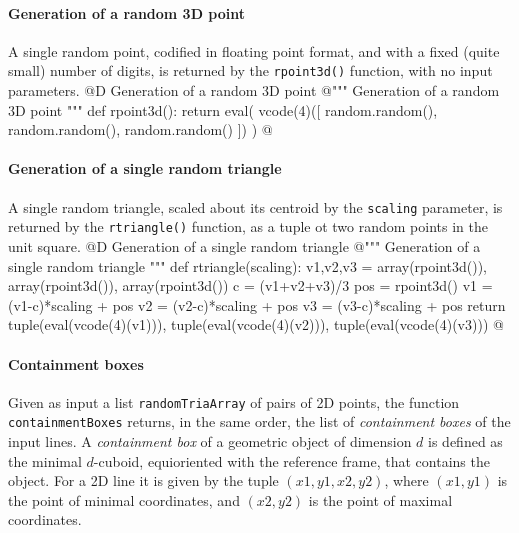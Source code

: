 \documentclass[11pt,oneside]{article}    %
\begin{document}
\paragraph{Generation of a random 3D point}
A single random point, codified in floating point format, and with a fixed (quite small) number of digits, is returned by the \texttt{rpoint3d()} function, with no input parameters.
@D Generation of a random 3D point
@{""" Generation of a random 3D point """
def rpoint3d():
    return eval( vcode(4)([ random.random(), random.random(), random.random() ]) )
@}
    
\paragraph{Generation of a single random triangle}
A single random triangle, scaled about its centroid by the \texttt{scaling} parameter, is returned by the \texttt{rtriangle()} function, as a tuple ot two random points in the unit square.
@D Generation of a single random triangle
@{""" Generation of a single random triangle """
def rtriangle(scaling):
    v1,v2,v3 = array(rpoint3d()), array(rpoint3d()), array(rpoint3d())
    c = (v1+v2+v3)/3
    pos = rpoint3d()
    v1 = (v1-c)*scaling + pos
    v2 = (v2-c)*scaling + pos
    v3 = (v3-c)*scaling + pos
    return tuple(eval(vcode(4)(v1))), tuple(eval(vcode(4)(v2))), tuple(eval(vcode(4)(v3)))
@}
    

\paragraph{Containment boxes}

Given as input a list \texttt{randomTriaArray} of pairs of 2D points, the function \texttt{containmentBoxes} returns, in the same order, the list of \emph{containment boxes} of the input lines. A \emph{containment box} of a geometric object of dimension $d$ is defined as the minimal $d$-cuboid, equioriented with the reference frame, that contains the object. For a 2D line it is given by the tuple $(x1,y1,x2,y2)$, where $(x1,y1)$ is the point of minimal coordinates, and $(x2,y2)$ is the point of maximal  coordinates.
\end{document}
